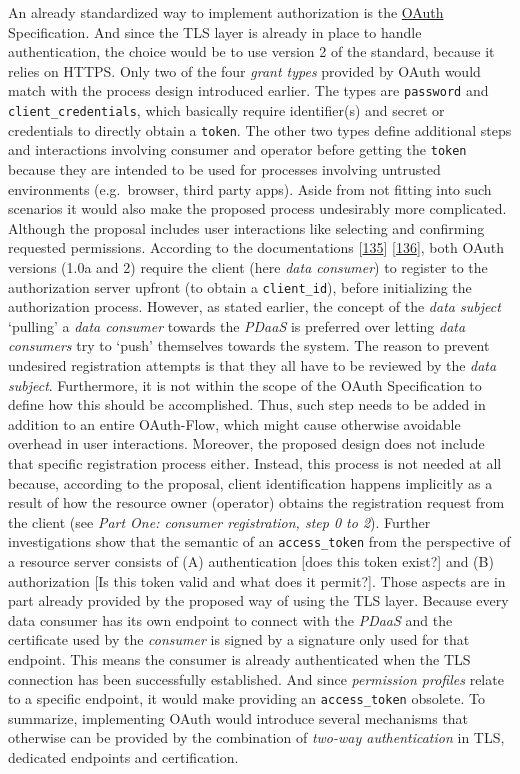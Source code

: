 \documentclass[12pt,english,a4paper,titlepage,cleardoublepage=empty,dottedtoc]{report}
\begin{document}
An already standardized way to implement authorization is the
\protect\hyperlink{def--oauth}{OAuth} Specification. And since the TLS
layer is already in place to handle authentication, the choice would be
to use version 2 of the standard, because it relies on HTTPS. Only two
of the four \emph{grant types} provided by OAuth would match with the
process design introduced earlier. The types are \texttt{password} and
\texttt{client\_credentials}, which basically require identifier(s) and
secret or credentials to directly obtain a \texttt{token}. The other two
types define additional steps and interactions involving consumer and
operator before getting the \texttt{token} because they are intended to
be used for processes involving untrusted environments (e.g.~browser,
third party apps). Aside from not fitting into such scenarios it would
also make the proposed process undesirably more complicated. Although
the proposal includes user interactions like selecting and confirming
requested permissions. According to the documentations
{[}\protect\hyperlink{ref-web_spec_oauth-1a_client-reg}{135}{]}
{[}\protect\hyperlink{ref-web_spec_oauth-2_client-reg}{136}{]}, both
OAuth versions (1.0a and 2) require the client (here \emph{data
consumer}) to register to the authorization server upfront (to obtain a
\texttt{client\_id}), before initializing the authorization process.
However, as stated earlier, the concept of the \emph{data subject}
`pulling' a \emph{data consumer} towards the \emph{PDaaS} is preferred
over letting \emph{data consumers} try to `push' themselves towards the
system. The reason to prevent undesired registration attempts is that
they all have to be reviewed by the \emph{data subject}. Furthermore, it
is not within the scope of the OAuth Specification to define how this
should be accomplished. Thus, such step needs to be added in addition to
an entire OAuth-Flow, which might cause otherwise avoidable overhead in
user interactions. Moreover, the proposed design does not include that
specific registration process either. Instead, this process is not
needed at all because, according to the proposal, client identification
happens implicitly as a result of how the resource owner (operator)
obtains the registration request from the client (see \emph{Part One:
consumer registration, step 0 to 2}). Further investigations show that
the semantic of an \texttt{access\_token} from the perspective of a
resource server consists of (A) authentication {[}does this token
exist?{]} and (B) authorization {[}Is this token valid and what does it
permit?{]}. Those aspects are in part already provided by the proposed
way of using the TLS layer. Because every data consumer has its own
endpoint to connect with the \emph{PDaaS} and the certificate used by
the \emph{consumer} is signed by a signature only used for that
endpoint. This means the consumer is already authenticated when the TLS
connection has been successfully established. And since \emph{permission
profiles} relate to a specific endpoint, it would make providing an
\texttt{access\_token} obsolete. To summarize, implementing OAuth would
introduce several mechanisms that otherwise can be provided by the
combination of \emph{two-way authentication} in TLS, dedicated endpoints
and certification.
\end{document}
